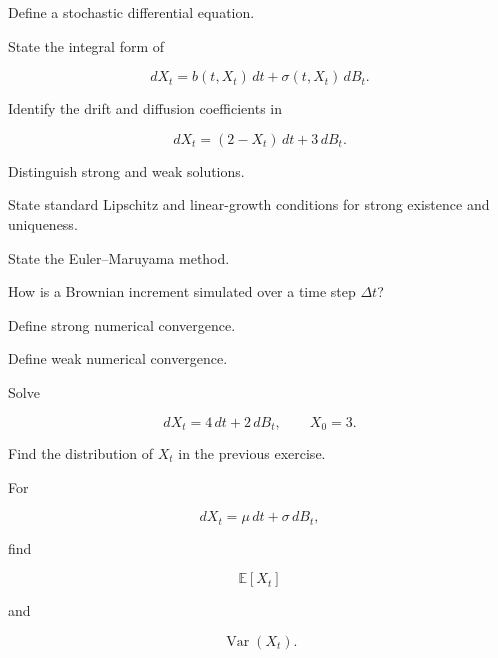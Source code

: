 \begin{exercise}[1]
Define a stochastic differential equation.
\end{exercise}

\begin{exercise}[1]
State the integral form of

\[
dX_t
=
b(t,X_t)\,dt
+
\sigma(t,X_t)\,dB_t.
\]
\end{exercise}

\begin{exercise}[1]
Identify the drift and diffusion coefficients in

\[
dX_t
=
(2-X_t)\,dt
+
3\,dB_t.
\]
\end{exercise}

\begin{exercise}[1]
Distinguish strong and weak solutions.
\end{exercise}

\begin{exercise}[1]
State standard Lipschitz and linear-growth conditions for strong
existence and uniqueness.
\end{exercise}

\begin{exercise}[1]
State the Euler--Maruyama method.
\end{exercise}

\begin{exercise}[1]
How is a Brownian increment simulated over a time step \(\Delta t\)?
\end{exercise}

\begin{exercise}[1]
Define strong numerical convergence.
\end{exercise}

\begin{exercise}[1]
Define weak numerical convergence.
\end{exercise}

\begin{exercise}[2]
Solve

\[
dX_t
=
4\,dt
+
2\,dB_t,
\qquad
X_0=3.
\]
\end{exercise}

\begin{exercise}[2]
Find the distribution of \(X_t\) in the previous exercise.
\end{exercise}

\begin{exercise}[2]
For

\[
dX_t
=
\mu\,dt+\sigma\,dB_t,
\]

find

\[
\mathbb{E}[X_t]
\]

and

\[
\operatorname{Var}(X_t).
\]
\end{exercise}

